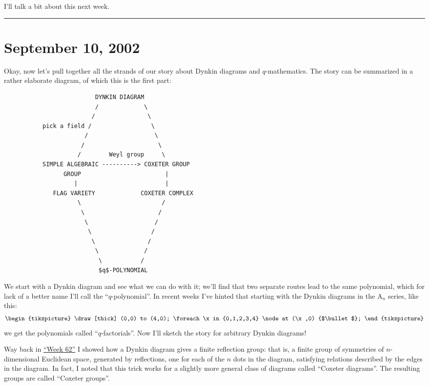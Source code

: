 \documentclass{article}
\begin{document}
I'll talk a bit about this next week.

\begin{center}\rule{0.5\linewidth}{0.5pt}\end{center}



\hypertarget{week186}{%
\section{September 10, 2002}\label{week186}}

Okay, now let's pull together all the strands of our story about Dynkin
diagrams and \(q\)-mathematics. The story can be summarized in a rather
elaborate diagram, of which this is the first part:

\begin{verbatim}
                          DYNKIN DIAGRAM
                          /             \
                         /               \
           pick a field /                 \ 
                       /                   \
                      /                     \
                     /        Weyl group     \
           SIMPLE ALGEBRAIC ----------> COXETER GROUP 
                 GROUP                        | 
                    |                         | 
              FLAG VARIETY             COXETER COMPLEX 
                     \                       /
                      \                     /
                       \                   /
                        \                 /
                         \               /
                          \             /
                           \           /
                           $q$-POLYNOMIAL
\end{verbatim}

We start with a Dynkin diagram and see what we can do with it; we'll
find that two separate routes lead to the same polynomial, which for
lack of a better name I'll call the ``\(q\)-polynomial''. In recent
weeks I've hinted that starting with the Dynkin diagrams in the
\(\mathrm{A}_n\) series, like this: \[
  \begin{tikzpicture}
    \draw[thick] (0,0) to (4,0);
    \foreach \x in {0,1,2,3,4}
      \node at (\x,0) {$\bullet$};
  \end{tikzpicture}
\] we get the polynomials called ``\(q\)-factorials''. Now I'll sketch
the story for arbitrary Dynkin diagrams!

Way back in \protect\hyperlink{week62}{``Week 62''} I showed how a
Dynkin diagram gives a finite reflection group: that is, a finite group
of symmetries of \(n\)-dimensional Euclidean space, generated by
reflections, one for each of the \(n\) dots in the diagram, satisfying
relations described by the edges in the diagram. In fact, I noted that
this trick works for a slightly more general class of diagrams called
``Coxeter diagrams''. The resulting groups are called ``Coxeter
groups''.
\end{document}
